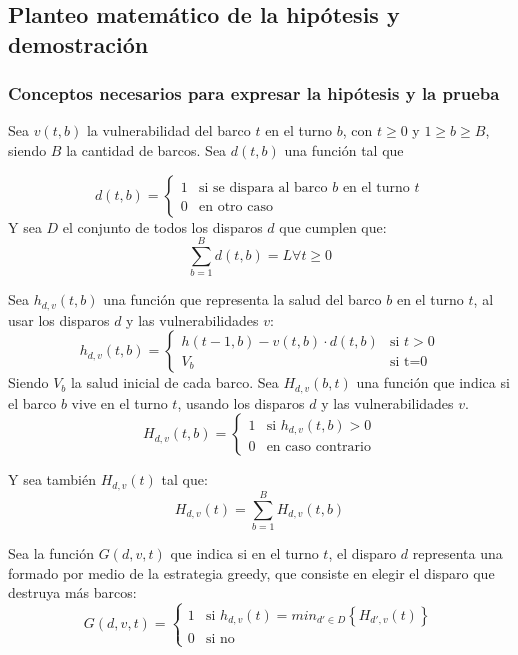 \documentclass{article}
\begin{document}
\subsection{Planteo matemático de la hipótesis y demostración}

\subsubsection{Conceptos necesarios para expresar la hipótesis y la prueba}

Sea $v(t,b)$ la vulnerabilidad del barco $t$ en el turno $b$, con $t\geq0$ y $1\geq b \geq B$, siendo $B$ la cantidad de barcos.
Sea $d(t,b)$ una función tal que

\[
    d(t,b)=
    \begin{cases}
        1 & \text{si se dispara al barco $b$ en el turno $t$} \\
        0 & \text{en otro caso}
    \end{cases}
\]
Y sea $D$ el conjunto de todos los disparos $d$ que cumplen que:
$$ \sum_{b=1}^{B} d(t,b) = L  \forall t \geq 0 $$

Sea $h_{d,v} (t,b)$ una función que representa la salud del barco $b$ en el turno $t$, al usar los disparos $d$ y las vulnerabilidades $v$:
\[
    h_{d,v}(t,b)=
    \begin{cases}
        h(t-1,b)-v(t,b) \cdot d(t,b) & \text{si $t>0$} \\
        V_b & \text{si t=0}
    \end{cases}
\]
Siendo $V_b$ la salud inicial de cada barco. Sea $H_{d,v}(b,t)$ una función que indica si el barco $b$ vive en el turno $t$, usando los disparos $d$ y las vulnerabilidades $v$.
\[
    H_{d,v}(t,b)=
    \begin{cases}
        1 & \text{si $h_{d,v}(t,b)>0$} \\
        0 & \text{en caso contrario}
    \end{cases}
\]

Y sea también $H_{d,v}(t)$ tal que: $$H_{d,v}(t)=\sum_{b=1}^{B} H_{d,v}(t,b)$$

Sea la función $G(d,v,t)$ que indica si en el turno $t$, el disparo $d$ representa una formado por medio de la estrategia greedy, que consiste en elegir el disparo que destruya más barcos:
\[
    G(d,v,t)=
    \begin{cases}
        1 & \text{si $h_{d,v}(t)=min_{d' \in D} \left \{ H_{d',v}(t) \right \} $} \\
        0 & \text{si no}
    \end{cases}
\]
\end{document}
